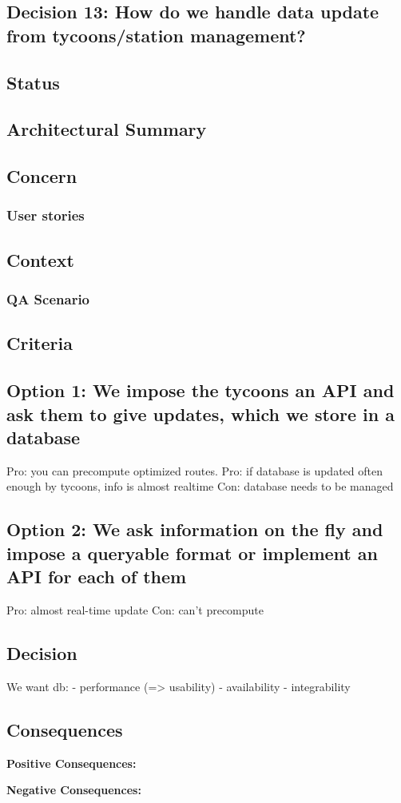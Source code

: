 \subsection{Decision 13: How do we handle data update from tycoons/station management?}

\subsection*{Status}

\subsection*{Architectural Summary}


\subsection*{Concern}
\subsubsection*{User stories}

\subsection*{Context}

\subsubsection*{QA Scenario} %

\subsection*{Criteria}
\begin{itemize}
\end{itemize}

\subsection*{Option 1: We impose the tycoons an API and ask them to give updates, which we store in a database}
Pro: you can precompute optimized routes.
Pro: if database is updated often enough by tycoons, info is almost realtime
Con: database needs to be managed

\subsection*{Option 2: We ask information on the fly and impose a queryable format or implement an API for each of them}
Pro: almost real-time update
Con: can't precompute

\subsection*{Decision}
We want db:
- performance (=> usability)
- availability 
- integrability

\subsection*{Consequences}
\textbf{Positive Consequences:}
\begin{itemize}
\end{itemize}
\textbf{Negative Consequences:}
\begin{itemize}
\end{itemize}

